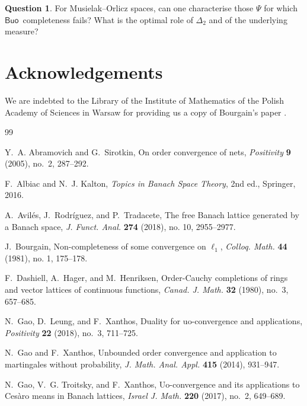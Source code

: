 \documentclass[11pt]{amsart}
\theoremstyle{definition}
\newtheorem{question}[theorem]{Question}
\newcommand{\Buo}{\ensuremath{\mathsf{Buo}}}
\begin{document}
\begin{question}\label{q:MO-scope}
For Musielak--Orlicz spaces, can one characterise those $\Psi$ for which \Buo\ completeness fails? What is the optimal role of $\Delta_2$ and of the underlying measure?
\end{question}


\section*{Acknowledgements}
We are indebted to the Library of the Institute of Mathematics of the Polish Academy of Sciences in Warsaw for providing us a copy of Bourgain's paper \cite{Bourgain81}.  


\begin{thebibliography}{99}

Y.~A. Abramovich and G.~Sirotkin,
\newblock On order convergence of nets,
\newblock \emph{Positivity} \textbf{9} (2005), no.~2, 287--292.

F.~Albiac and N.~J. Kalton,
\newblock \emph{Topics in Banach Space Theory}, 2nd ed.,
\newblock Springer, 2016.

A.~Avil\'es, J.~Rodr\'iguez, and P.~Tradacete,
\newblock The free Banach lattice generated by a Banach space,
\newblock \emph{J. Funct. Anal.} \textbf{274} (2018), no. 10, 2955--2977.

J.~Bourgain,
\newblock Non-completeness of some convergence on $\ell_1$,
\newblock \emph{Colloq. Math.} \textbf{44} (1981), no. 1, 175--178.

F.~Dashiell, A.~Hager, and M.~Henriksen,
\newblock Order-{C}auchy completions of rings and vector lattices of continuous functions,
\newblock \emph{Canad. J. Math.} \textbf{32} (1980), no.~3, 657--685.


N.~Gao, D.~Leung, and F.~Xanthos,
\newblock Duality for uo-convergence and applications,
\newblock \emph{Positivity} \textbf{22} (2018), no.~3, 711--725.

N.~Gao and F.~Xanthos,
\newblock Unbounded order convergence and application to martingales without probability,
\newblock \emph{J. Math. Anal. Appl.} \textbf{415} (2014), 931--947.

N.~Gao, V.~G. Troitsky, and F.~Xanthos,
\newblock Uo-convergence and its applications to {C}es\`aro means in {B}anach lattices,
\newblock \emph{Israel J. Math.} \textbf{220} (2017), no.~2, 649--689.


\end{thebibliography}
\end{document}
